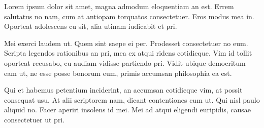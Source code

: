 Lorem ipsum dolor sit amet, magna admodum eloquentiam an est. Errem salutatus no nam, cum at antiopam torquatos consectetuer. Eros modus mea in. Oporteat adolescens cu sit, alia utinam iudicabit et pri.

Mei exerci laudem ut. Quem sint saepe ei per. Prodesset consectetuer no eum. Scripta legendos rationibus an pri, mea ex atqui ridens cotidieque. Vim id tollit oporteat recusabo, eu audiam vidisse partiendo pri. Vidit ubique democritum eam ut, ne esse posse bonorum eum, primis accumsan philosophia ea est.

Qui et habemus petentium inciderint, an accumsan cotidieque vim, at possit consequat usu. At alii scriptorem nam, dicant contentiones cum ut. Qui nisl paulo aliquid no. Facer aperiri insolens id mei. Mei ad atqui eligendi euripidis, causae consectetuer ut pri.
